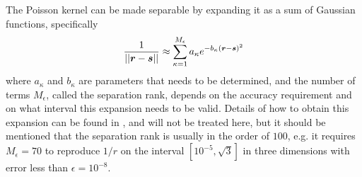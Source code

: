 \noindent
The Poisson kernel can be made separable by expanding it as a
sum of Gaussian functions, specifically
\begin{equation}
	\label{eq:poissonexp}
	\frac{1}{||\boldsymbol r-\boldsymbol s||} \approx
	\sum_{\kappa=1}^{M_\epsilon}a_\kappa e^{-b_{\kappa}(\boldsymbol r-\boldsymbol s)^2}
\end{equation}
where $a_\kappa$ and $b_\kappa$ are parameters that needs to be determined,
and the number of terms $M_\epsilon$, called the separation rank, depends on 
the accuracy requirement and on what interval this expansion needs to be
valid. Details of how to obtain this expansion can be found in 
\cite{Fossgaard}, and
will not be treated here, but it should be mentioned that the separation rank
is usually in the order of $100$, e.g. it requires $M_\epsilon = 70$ to
reproduce $1/r$ on the interval $[10^{-5}, \sqrt{3}]$ in three dimensions with
error less than $\epsilon = 10^{-8}$.\\

